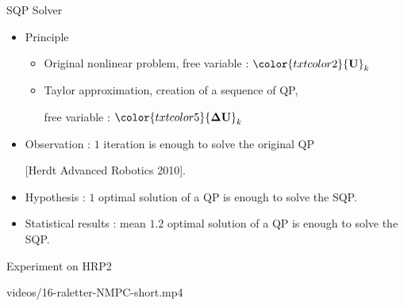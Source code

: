 \begin{frame}{SQP Solver}

\begin{itemize}
\item Principle
\begin{itemize}
\item Original nonlinear problem, free variable : ${\color{txtcolor2}{\bf U}_k}$
\item Taylor approximation, creation of a sequence of QP,
      
      free variable : ${\color{txtcolor5}{\bf \Delta U}_k}$
\end{itemize}
\end{itemize}

\begin{itemize}
\item Observation : $1$ iteration is enough to solve the original QP

[Herdt Advanced Robotics 2010].
\item Hypothesis : $1$ optimal solution of a QP is enough to solve the SQP.
\item Statistical results : mean $1.2$ optimal solution of a QP is enough to solve the SQP.
\end{itemize}

\end{frame}


\begin{frame}{Experiment on HRP2}
  \begin{center}
    {videos/16-raletter-NMPC-short.mp4}
  \end{center}
  \vspace*{-0.5cm}
\end{frame}


